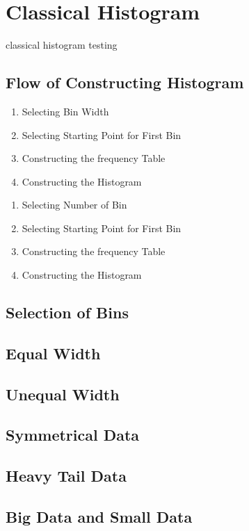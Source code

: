 \section{Classical Histogram}

classical histogram testing

\subsection{Flow of Constructing Histogram}
\begin{enumerate}
	\item Selecting Bin Width
	\item Selecting Starting Point for First Bin
	\item Constructing the frequency Table
	\item Constructing the Histogram
\end{enumerate}

\begin{enumerate}
	\item Selecting Number of Bin
	\item Selecting Starting Point for First Bin
	\item Constructing the frequency Table
	\item Constructing the Histogram
\end{enumerate}
\subsection{Selection of Bins}

\subsection{Equal Width}

\subsection{Unequal Width}

\subsection{Symmetrical Data}

\subsection{Heavy Tail Data}
 
\subsection{Big Data and Small Data}
